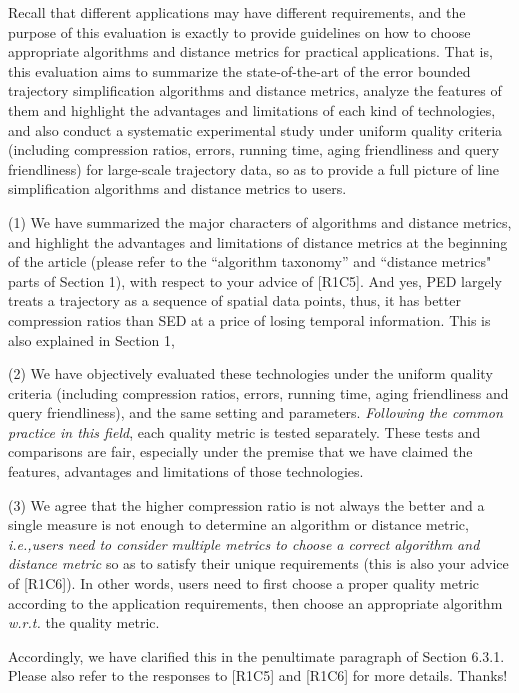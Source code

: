 \documentclass{letter}
\newcommand{\ie}{\emph{i.e.,}\xspace}
\newcommand{\wrt}{\emph{w.r.t.}\xspace}
\begin{document}
Recall that different applications may have different requirements, and the purpose of this evaluation is exactly to
provide guidelines on how to choose appropriate algorithms and distance metrics for practical applications.
That is, this evaluation aims to summarize the state-of-the-art of the error bounded trajectory simplification algorithms and distance metrics, analyze the features of them and highlight the advantages and limitations of each kind of technologies, and also conduct a systematic experimental study under uniform quality criteria (including compression ratios, errors, running time, aging friendliness and query friendliness) for large-scale trajectory data, so as to provide a full picture of line simplification algorithms and distance metrics to users.

(1) We have summarized the major characters of algorithms and distance metrics, and highlight the advantages and limitations of distance metrics at the beginning of the article (please refer to the ``algorithm taxonomy'' and ``distance metrics" parts of Section 1), with respect to your advice of [R1C5]. And yes, PED largely treats a trajectory as a sequence of spatial data points, thus, it has better compression ratios than SED at a price of losing temporal information. This is also explained in Section 1,

(2) We have objectively evaluated these technologies under the uniform quality criteria (including compression ratios, errors, running time, aging friendliness and query friendliness), and the same setting and parameters. {\em Following the common practice in this field}, each quality metric is tested separately. These tests and comparisons are fair, especially under the premise that we have claimed the features, advantages and limitations of those technologies. %

(3) We agree that the higher compression ratio is not always the better and a single measure is not enough to determine an algorithm or distance metric, \ie \emph{users need to consider multiple metrics to choose a correct algorithm and distance metric} so as to satisfy their unique requirements (this is also your advice of [R1C6]). In other words, users need to first choose a proper quality metric according to the application requirements, then choose an appropriate algorithm \wrt the quality metric.

Accordingly, we have clarified this in the penultimate paragraph of Section 6.3.1. Please also refer to the responses to [R1C5] and [R1C6] for more details. Thanks!
\end{document}
